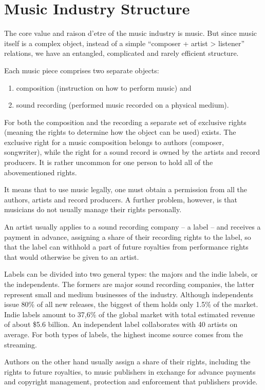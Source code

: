 \documentclass[12pt]{report}
\begin{document}
\section{Music Industry Structure}
\label{industry-structure}
\begin{multicols}{2}
The core value and raison d’etre of the music industry is music. But since music itself is a complex object, instead of a simple “composer + artist > listener” relations, we have an entangled, complicated and rarely efficient structure.

Each music piece comprises two separate objects:
\begin{enumerate}
	\item composition (instruction on how to perform music) and
	\item sound recording (performed music recorded on a physical medium).
\end{enumerate}

For both the composition and the recording a separate set of exclusive rights (meaning the rights to determine how the object can be used) exists. The exclusive right for a music composition belongs to authors (composer, songwriter), while the right for a sound record is owned by the artists and record producers. It is rather uncommon for one person to hold all of the abovementioned rights.

It means that to use music legally, one must obtain a permission from all the authors, artists and record producers. A further problem, however, is that musicians do not usually manage their rights personally.

An artist usually applies to a sound recording company – a label – and receives a payment in advance, assigning a share of their recording rights to the label, so that the label can withhold a part of future royalties from performance rights that would otherwise be given to an artist.

Labels can be divided into two general types: the majors and the indie labels, or the independents. The formers are major sound recording companies, the latter represent small and medium businesses of the industry. Although independents issue 80\% of all new releases, the biggest of them holds only 1.5\% of the market. Indie labels amount to 37,6\% of the global market with total estimated revenue of about \$5.6 billion. An independent label collaborates with 40 artists on average. For both types of labels, the highest income source comes from the streaming.

Authors on the other hand usually assign a share of their rights, including the rights to future royalties, to music publishers in exchange for advance payments and copyright management, protection and enforcement that publishers provide.


\end{multicols}
\end{document}
